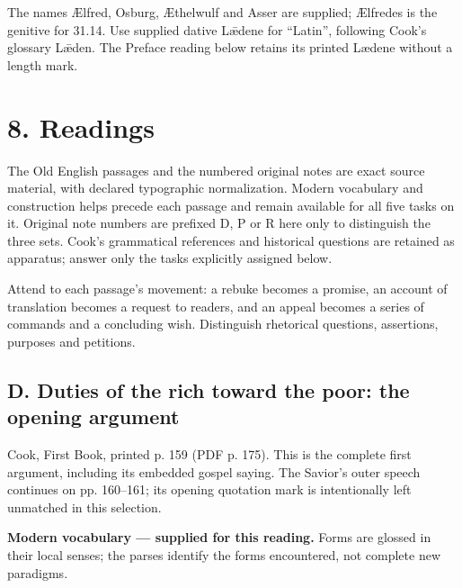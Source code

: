 The names Ælfred, Osburg, Æthelwulf and Asser are supplied; Ælfredes is the genitive for 31.14. Use supplied dative Lǣdene for “Latin”, following Cook’s glossary Lǣden. The Preface reading below retains its printed Lædene without a length mark.

\section*{8. Readings}

The Old English passages and the numbered original notes are exact source material, with declared typographic normalization. Modern vocabulary and construction helps precede each passage and remain available for all five tasks on it. Original note numbers are prefixed D, P or R here only to distinguish the three sets. Cook’s grammatical references and historical questions are retained as apparatus; answer only the tasks explicitly assigned below.

Attend to each passage’s movement: a rebuke becomes a promise, an account of translation becomes a request to readers, and an appeal becomes a series of commands and a concluding wish. Distinguish rhetorical questions, assertions, purposes and petitions.

\subsection*{D. Duties of the rich toward the poor: the opening argument}

Cook, First Book, printed p. 159 (PDF p. 175). This is the complete first argument, including its embedded gospel saying. The Savior’s outer speech continues on pp. 160–161; its opening quotation mark is intentionally left unmatched in this selection.

\textbf{Modern vocabulary — supplied for this reading.} Forms are glossed in their local senses; the parses identify the forms encountered, not complete new paradigms.

